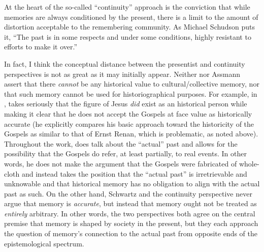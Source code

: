 At the heart of the so-called ``continuity'' approach is the conviction that while memories are always conditioned by the present, there is a limit to the amount of distortion acceptable to the remembering community. As Michael Schudson puts it, ``The past is in some respects and under some conditions, highly resistant to efforts to make it over.''\autocite[107]{schudson_communication1989}  

In fact, I think the conceptual distance between the presentist and continuity perspectives is not as great as it may initially appear. Neither \halbwachs nor Assmann assert that there \emph{cannot} be any historical value to cultural/collective memory, nor that such memory cannot be used for historiographical purposes. For example, in , \halbwachs takes seriously that the figure of Jesus \emph{did} exist as an historical person while making it clear that he does not accept the Gospels at face value as historically accurate (he explicitly compares his basic approach toward the historicity of the Gospels as similar to that of Ernst Renan, which is problematic, as noted above).\autocite[205--206]{halbwachs1992} Throughout the work, \halbwachs does talk about the ``actual'' past and allows for the possibility that the Gospels do refer, at least partially, to real events. In other words, he does not make the argument that the Gospels were fabricated of whole-cloth and instead takes the position that the ``actual past'' is irretrievable and unknowable and that historical memory has no obligation to align with the actual past as such. On the other hand, Schwartz and the continuity perspective never argue that memory is \emph{accurate}, but instead that memory ought not be treated as \emph{entirely} arbitrary. In other words, the two perspectives both agree on the central premise that memory is shaped by society in the present, but they each approach the question of memory's connection to the actual past from opposite ends of the epistemological spectrum.  

